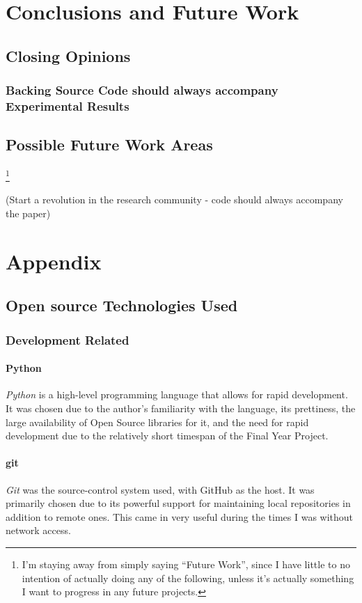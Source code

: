\documentclass[a4paper,11pt]{report}
\begin{document}
\chapter{Conclusions and Future Work\label{cha:conclusions}}

\section{Closing Opinions}
\subsection{Backing Source Code should always accompany Experimental Results}

\section{Possible Future Work Areas} \footnote{I'm staying away from simply saying ``Future Work'', since I have little to no intention of actually doing any of the following, unless it's actually something I want to progress in any future projects.}



(Start a revolution in the research community - code should always accompany the paper)

\chapter{Appendix}
\section{Open source Technologies Used}

\subsection{Development Related}

\subsubsection*{Python}
\emph{Python}\citep{prog:python} is a high-level programming language that allows for rapid development. It was chosen due to the author's familiarity with the language, its prettiness, the large availability of Open Source libraries for it, and the need for rapid development due to the relatively short timespan of the Final Year Project.

\subsubsection*{git}
\emph{Git}\citep{prog:git} was the source-control system used, with GitHub as the host. It was primarily chosen due to its powerful support for maintaining local repositories in addition to remote ones. This came in very useful during the times I was without network access.
\end{document}
